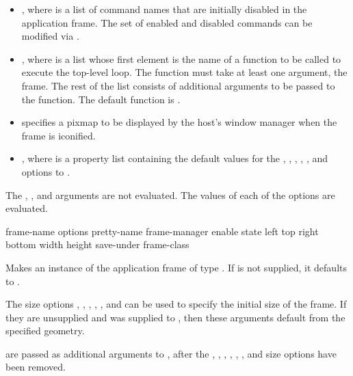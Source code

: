\begin{itemize}
\item {} , where  is a list of
command names that are initially disabled in the application frame.  The set of
enabled and disabled commands can be modified via .

\item {} , where  is a list whose first
element is the name of a function to be called to execute the top-level loop.
The function must take at least one argument, the frame.  The rest of the list
consists of additional arguments to be passed to the function.  The default
function is .

\item {}  specifies a pixmap to be displayed by the host's
window manager when the frame is iconified.

\item {} , where  is a property list
containing the default values for the , , ,
, , and  options to
.
\end{itemize}

The , , and  arguments are not evaluated.
The values of each of the options are evaluated.


 {frame-name \rest options
                                 \key pretty-name 
                                      frame-manager enable state 
                                      left top right bottom width height
                                      save-under frame-class
                                 \allow} 

Makes an instance of the application frame of type .  If
 is not supplied, it defaults to .

The size options , , , , ,
and  can be used to specify the initial size of the frame.  If they
are unsupplied and  was supplied to ,
then these arguments default from the specified geometry.

 are passed as additional arguments to , after
the , , , ,
, , and size options have been removed.

